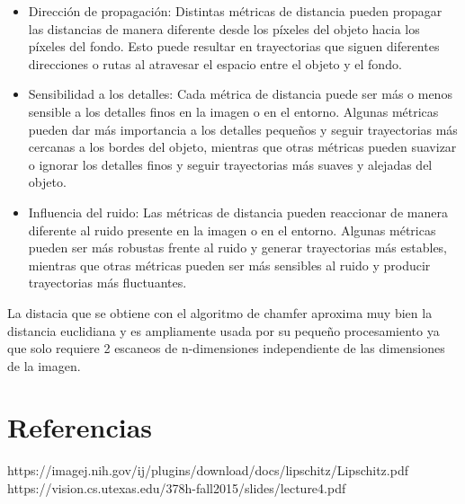 \documentclass{article}
\begin{document}
\begin{itemize}
  \begin{itemize}
  \item Dirección de propagación: Distintas métricas de distancia pueden propagar las distancias de manera diferente desde los píxeles del objeto hacia los píxeles del fondo. Esto puede resultar en trayectorias que siguen diferentes direcciones o rutas al atravesar el espacio entre el objeto y el fondo.
  \item Sensibilidad a los detalles: Cada métrica de distancia puede ser más o menos sensible a los detalles finos en la imagen o en el entorno. Algunas métricas pueden dar más importancia a los detalles pequeños y seguir trayectorias más cercanas a los bordes del objeto, mientras que otras métricas pueden suavizar o ignorar los detalles finos y seguir trayectorias más suaves y alejadas del objeto.
  \item Influencia del ruido: Las métricas de distancia pueden reaccionar de manera diferente al ruido presente en la imagen o en el entorno. Algunas métricas pueden ser más robustas frente al ruido y generar trayectorias más estables, mientras que otras métricas pueden ser más sensibles al ruido y producir trayectorias más fluctuantes.
  \end{itemize}
  
\end{itemize}

La distacia que se obtiene con el algoritmo de chamfer aproxima muy bien la distancia euclidiana y es ampliamente usada por su pequeño procesamiento ya que solo requiere 2 escaneos de n-dimensiones independiente de las dimensiones de la imagen.

\section*{Referencias}

https://imagej.nih.gov/ij/plugins/download/docs/lipschitz/Lipschitz.pdf\\
https://vision.cs.utexas.edu/378h-fall2015/slides/lecture4.pdf
\end{document}

